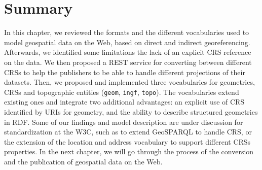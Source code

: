 \section{Summary}
\label{sec:summarych1}
In this chapter, we reviewed the formats and the different vocabularies used to model geospatial data on the Web, based on direct and indirect georeferencing. Afterwards, we identified some limitations the lack of an explicit CRS reference on the data. We then proposed a REST service for converting between different CRSs to help the publishers to be able to handle different projections of their datasets. Then, we proposed and implemented three vocabularies for geometries, CRSs and topographic entities (\texttt{geom}, \texttt{ingf}, \texttt{topo}). The vocabularies extend existing ones and integrate two additional advantages: an explicit use of CRS identified by URIs for geometry, and the ability to describe structured geometries in RDF. Some of our findings and model description are under discussion for standardization at the W3C, such as to extend GeoSPARQL to handle CRS, or the extension of the location and address vocabulary \cite{locnvocab} to support different CRSs properties.
In the next chapter, we will go through the process of the conversion and the publication of geospatial data on the Web.


